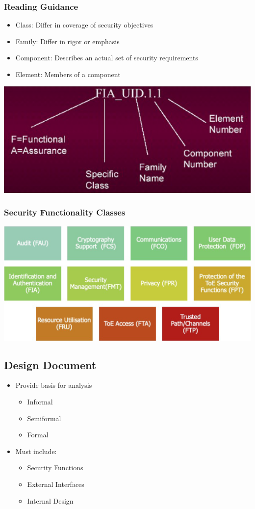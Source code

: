 \subsubsection{Reading Guidance}
\begin{itemize}
    \item Class: Differ in coverage of security objectives
    \item Family: Differ in rigor or emphasis
    \item Component: Describes an actual set of security requirements
    \item Element: Members of a component
\end{itemize}
\includegraphics[width=0.6\linewidth]{../img/reading_guidance.png}

\subsubsection{Security Functionality Classes}
\includegraphics[width=\linewidth]{../img/security_functionality_classes.png}

\subsection{Design Document}
\begin{itemize}
    \item Provide basis for analysis
    \begin{itemize}
        \item Informal
        \item Semiformal
        \item Formal
    \end{itemize}
    \item Must include:
    \begin{itemize}
        \item Security Functions
        \item External Interfaces
        \item Internal Design
    \end{itemize}
\end{itemize}

